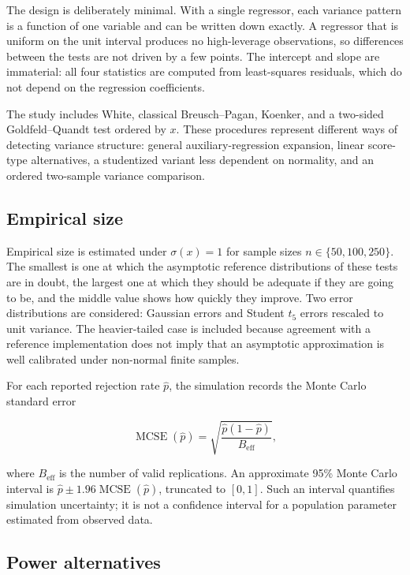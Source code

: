 The design is deliberately minimal. With a single regressor, each variance
pattern is a function of one variable and can be written down exactly. A
regressor that is uniform on the unit interval produces no high-leverage
observations, so differences between the tests are not driven by a few points.
The intercept and slope are immaterial: all four statistics are computed from
least-squares residuals, which do not depend on the regression coefficients.

The study includes White, classical Breusch--Pagan, Koenker, and a two-sided
Goldfeld--Quandt test ordered by \(x\). These procedures represent different
ways of detecting variance structure: general auxiliary-regression expansion,
linear score-type alternatives, a studentized variant less dependent on
normality, and an ordered two-sample variance comparison.

\subsection{Empirical size}\label{empirical-size}

Empirical size is estimated under \(\sigma(x)=1\) for sample sizes
\(n\in\{50,100,250\}\). The smallest is one at which the asymptotic
reference distributions of these tests are in doubt, the largest one at which
they should be adequate if they are going to be, and the middle value shows
how quickly they improve. Two error distributions are considered: Gaussian
errors and Student \(t_5\) errors rescaled to unit variance. The heavier-tailed
case is included because agreement with a reference implementation does not
imply that an asymptotic approximation is well calibrated under non-normal
finite samples.

For each reported rejection rate \(\widehat p\), the simulation records the
Monte Carlo standard error

\[
  \operatorname{MCSE}(\widehat p)
  = \sqrt{\frac{\widehat p(1-\widehat p)}{B_{\mathrm{eff}}}},
\]

where \(B_{\mathrm{eff}}\) is the number of valid replications. An
approximate 95\% Monte Carlo interval is
\(\widehat p \pm 1.96\operatorname{MCSE}(\widehat p)\), truncated to
\([0,1]\). Such an interval quantifies simulation uncertainty; it is not a
confidence interval for a population parameter estimated from observed data.

\subsection{Power alternatives}\label{power-alternatives}

